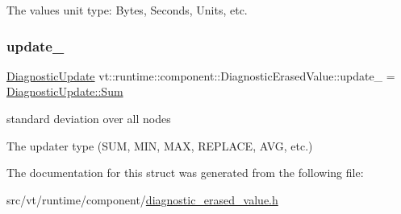 The value\textquotesingle{}s unit type\+: Bytes, Seconds, Units, etc. 

\mbox{\label{structvt_1_1runtime_1_1component_1_1_diagnostic_erased_value_a8bda31562af9d79c6e0a4ce92c311ae6}} 
\subsubsection{\texorpdfstring{update\+\_\+}{update\_}}
{\footnotesize\ttfamily \hyperlink{namespacevt_1_1runtime_1_1component_a896637e6e183a909a17bfd8d3943c206}{Diagnostic\+Update} vt\+::runtime\+::component\+::\+Diagnostic\+Erased\+Value\+::update\+\_\+ = \hyperlink{namespacevt_1_1runtime_1_1component_a896637e6e183a909a17bfd8d3943c206aa0ec87054b5e5b7847d0d8780a01a3d5}{Diagnostic\+Update\+::\+Sum}}



standard deviation over all nodes 

The updater type (S\+UM, M\+IN, M\+AX, R\+E\+P\+L\+A\+CE, A\+VG, etc.) 

The documentation for this struct was generated from the following file\+:\begin{DoxyCompactItemize}
\item 
src/vt/runtime/component/\hyperlink{diagnostic__erased__value_8h}{diagnostic\+\_\+erased\+\_\+value.\+h}\end{DoxyCompactItemize}
